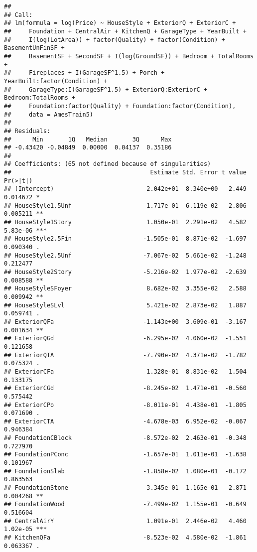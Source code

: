 \documentclass[
]{article}
\begin{document}
\begin{verbatim}
## 
## Call:
## lm(formula = log(Price) ~ HouseStyle + ExteriorQ + ExteriorC + 
##     Foundation + CentralAir + KitchenQ + GarageType + YearBuilt + 
##     I(log(LotArea)) + factor(Quality) + factor(Condition) + BasementUnFinSF + 
##     BasementSF + SecondSF + I(log(GroundSF)) + Bedroom + TotalRooms + 
##     Fireplaces + I(GarageSF^1.5) + Porch + YearBuilt:factor(Condition) + 
##     GarageType:I(GarageSF^1.5) + ExteriorQ:ExteriorC + Bedroom:TotalRooms + 
##     Foundation:factor(Quality) + Foundation:factor(Condition), 
##     data = AmesTrain5)
## 
## Residuals:
##      Min       1Q   Median       3Q      Max 
## -0.43420 -0.04849  0.00000  0.04137  0.35186 
## 
## Coefficients: (65 not defined because of singularities)
##                                       Estimate Std. Error t value Pr(>|t|)    
## (Intercept)                          2.042e+01  8.340e+00   2.449 0.014672 *  
## HouseStyle1.5Unf                     1.717e-01  6.119e-02   2.806 0.005211 ** 
## HouseStyle1Story                     1.050e-01  2.291e-02   4.582 5.83e-06 ***
## HouseStyle2.5Fin                    -1.505e-01  8.871e-02  -1.697 0.090340 .  
## HouseStyle2.5Unf                    -7.067e-02  5.661e-02  -1.248 0.212477    
## HouseStyle2Story                    -5.216e-02  1.977e-02  -2.639 0.008588 ** 
## HouseStyleSFoyer                     8.682e-02  3.355e-02   2.588 0.009942 ** 
## HouseStyleSLvl                       5.421e-02  2.873e-02   1.887 0.059741 .  
## ExteriorQFa                         -1.143e+00  3.609e-01  -3.167 0.001634 ** 
## ExteriorQGd                         -6.295e-02  4.060e-02  -1.551 0.121658    
## ExteriorQTA                         -7.790e-02  4.371e-02  -1.782 0.075324 .  
## ExteriorCFa                          1.328e-01  8.831e-02   1.504 0.133175    
## ExteriorCGd                         -8.245e-02  1.471e-01  -0.560 0.575442    
## ExteriorCPo                         -8.011e-01  4.438e-01  -1.805 0.071690 .  
## ExteriorCTA                         -4.678e-03  6.952e-02  -0.067 0.946384    
## FoundationCBlock                    -8.572e-02  2.463e-01  -0.348 0.727970    
## FoundationPConc                     -1.657e-01  1.011e-01  -1.638 0.101967    
## FoundationSlab                      -1.858e-02  1.080e-01  -0.172 0.863563    
## FoundationStone                      3.345e-01  1.165e-01   2.871 0.004268 ** 
## FoundationWood                      -7.499e-02  1.155e-01  -0.649 0.516604    
## CentralAirY                          1.091e-01  2.446e-02   4.460 1.02e-05 ***
## KitchenQFa                          -8.523e-02  4.580e-02  -1.861 0.063367 .  

\end{verbatim}
\end{document}
